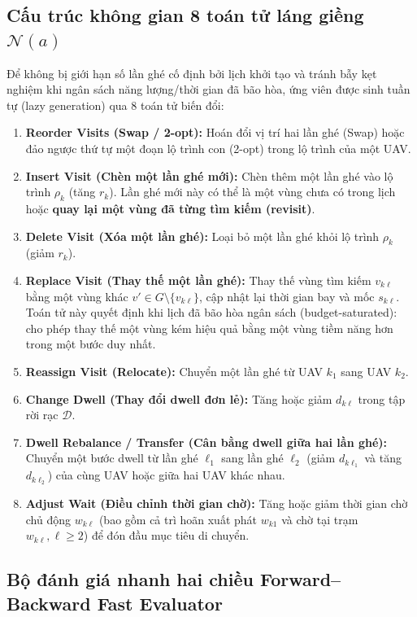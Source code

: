 \documentclass[12pt,a4paper]{article}
\begin{document}
\subsection{Cấu trúc không gian 8 toán tử láng giềng $\mathcal{N}(a)$}

Để không bị giới hạn số lần ghé cố định bởi lịch khởi tạo và tránh bẫy kẹt nghiệm khi ngân sách năng lượng/thời gian đã bão hòa, ứng viên được sinh tuần tự (lazy generation) qua 8 toán tử biến đổi:
\begin{enumerate}[label=\textbf{\arabic*.}]
    \item \textbf{Reorder Visits (Swap / 2-opt):} Hoán đổi vị trí hai lần ghé (Swap) hoặc đảo ngược thứ tự một đoạn lộ trình con (2-opt) trong lộ trình của một UAV.
    \item \textbf{Insert Visit (Chèn một lần ghé mới):} Chèn thêm một lần ghé vào lộ trình $\rho_k$ (tăng $r_k$). Lần ghé mới này có thể là một vùng chưa có trong lịch hoặc \textbf{quay lại một vùng đã từng tìm kiếm (revisit)}.
    \item \textbf{Delete Visit (Xóa một lần ghé):} Loại bỏ một lần ghé khỏi lộ trình $\rho_k$ (giảm $r_k$).
    \item \textbf{Replace Visit (Thay thế một lần ghé):} Thay thế vùng tìm kiếm $v_{k\ell}$ bằng một vùng khác $v' \in G \setminus \{v_{k\ell}\}$, cập nhật lại thời gian bay và mốc $s_{k\ell}$. Toán tử này quyết định khi lịch đã bão hòa ngân sách (budget-saturated): cho phép thay thế một vùng kém hiệu quả bằng một vùng tiềm năng hơn trong một bước duy nhất.
    \item \textbf{Reassign Visit (Relocate):} Chuyển một lần ghé từ UAV $k_1$ sang UAV $k_2$.
    \item \textbf{Change Dwell (Thay đổi dwell đơn lẻ):} Tăng hoặc giảm $d_{k\ell}$ trong tập rời rạc $\mathcal{D}$.
    \item \textbf{Dwell Rebalance / Transfer (Cân bằng dwell giữa hai lần ghé):} Chuyển một bước dwell từ lần ghé $\ell_1$ sang lần ghé $\ell_2$ (giảm $d_{k\ell_1}$ và tăng $d_{k\ell_2}$) của cùng UAV hoặc giữa hai UAV khác nhau.
    \item \textbf{Adjust Wait (Điều chỉnh thời gian chờ):} Tăng hoặc giảm thời gian chờ chủ động $w_{k\ell}$ (bao gồm cả trì hoãn xuất phát $w_{k1}$ và chờ tại trạm $w_{k\ell}, \ell \ge 2$) để đón đầu mục tiêu di chuyển.
\end{enumerate}

\subsection{Bộ đánh giá nhanh hai chiều Forward--Backward Fast Evaluator}
\end{document}

